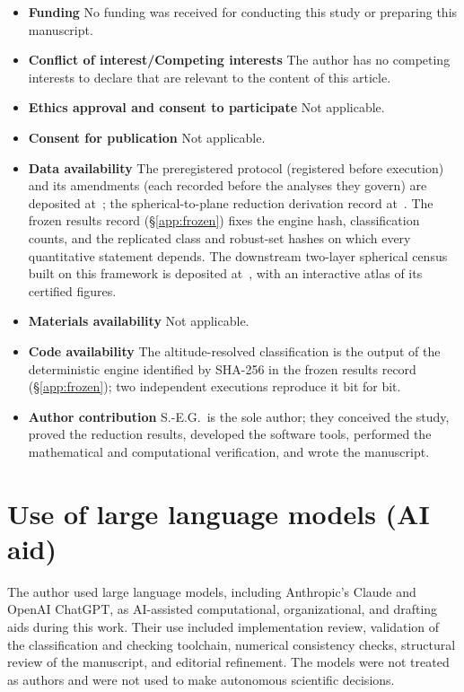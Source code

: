 \documentclass[pdflatex,sn-mathphys-num]{sn-jnl}
\theoremstyle{thmstyleone}%
\theoremstyle{thmstyletwo}%
\theoremstyle{thmstylethree}%
\begin{document}
\begin{itemize}
\item \textbf{Funding}
No funding was received for conducting this study or preparing this manuscript.

\item \textbf{Conflict of interest/Competing interests}
The author has no competing interests to declare that are relevant to the content of this article.

\item \textbf{Ethics approval and consent to participate}
Not applicable.

\item \textbf{Consent for publication}
Not applicable.

\item \textbf{Data availability}
The preregistered protocol (registered before execution) and its amendments
(each recorded before the analyses they govern) are deposited at~\cite{prereg};
the spherical-to-plane reduction derivation record at~\cite{bridge}. The frozen results
record (\S\ref{app:frozen}) fixes the engine hash, classification counts, and the
replicated class and robust-set hashes on which every quantitative statement depends.
The downstream two-layer spherical census built on this framework is deposited
at~\cite{sphericaldataset}, with an interactive atlas of its certified figures.

\item \textbf{Materials availability}
Not applicable.

\item \textbf{Code availability}
The altitude-resolved classification is the output of the deterministic engine
identified by SHA-256 in the frozen results record (\S\ref{app:frozen}); two
independent executions reproduce it bit for bit.

\item \textbf{Author contribution}
S.-E.G.\ is the sole author; they conceived the study, proved the reduction results, developed the software tools, performed the mathematical and computational verification, and wrote the manuscript.
\end{itemize}

\section*{Use of large language models (AI aid)}
The author used large language models, including Anthropic's Claude and OpenAI ChatGPT, as AI-assisted computational, organizational, and drafting aids during this work. Their use included implementation review, validation of the classification and checking toolchain, numerical consistency checks, structural review of the manuscript, and editorial refinement. The models were not treated as authors and were not used to make autonomous scientific decisions.
\end{document}
